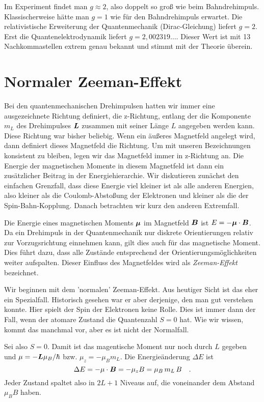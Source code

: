 Im Experiment findet man $g \approx 2$, also doppelt so groß wie beim Bahndrehimpuls. Klassischerweise hätte man $g=1$ wie für den Bahndrehimpuls erwartet. Die relativistische Erweiterung der Quantenmechanik (Dirac-Gleichung) liefert $g=2$. Erst die Quantenelektrodynamik liefert $g=2,002319\dots$. Dieser Wert ist mit 13 Nachkommastellen extrem genau bekannt und stimmt mit der Theorie überein.


\section{Normaler Zeeman-Effekt}

Bei den quantenmechanischen Drehimpulsen hatten wir immer eine ausgezeichnete Richtung definiert, die z-Richtung, entlang der die Komponente $m_L$ des Drehimpulses $\boldsymbol{L}$ zusammen mit seiner Länge $L$ angegeben werden kann. Diese Richtung war bisher beliebig. Wenn ein äußeres Magnetfeld angelegt wird, dann definiert dieses Magnetfeld die Richtung. Um mit unseren Bezeichnungen konsistent zu bleiben, legen wir das Magnetfeld immer in z-Richtung an. Die Energie der magnetischen Momente in diesem Magnetfeld ist dann ein zusätzlicher Beitrag in der Energiehierarchie. Wir diskutieren zunächst den einfachen Grenzfall, dass diese Energie viel kleiner ist als alle anderen Energien, also kleiner als die Coulomb-Abstoßung  der Elektronen und kleiner als die der Spin-Bahn-Kopplung. Danach betrachten wir kurz den anderen Extremfall.

Die Energie eines magnetischen Moments $\boldsymbol{\mu}$ im Magnetfeld $\boldsymbol{B}$ ist $E = - \boldsymbol{\mu} \cdot \boldsymbol{B}$. Da ein Drehimpuls in der Quantenmechanik nur diskrete Orientierungen relativ zur Vorzugsrichtung einnehmen kann, gilt dies auch für das magnetische Moment. Dies führt dazu, dass alle Zustände entsprechend der Orientierungsmöglichkeiten weiter aufspalten. Dieser Einfluss des Magnetfeldes wird als \emph{Zeeman-Effekt} bezeichnet. 

Wir beginnen mit dem 'normalen' Zeeman-Effekt. Aus heutiger Sicht ist das eher ein Spezialfall. Historisch gesehen war er aber derjenige, den man gut verstehen konnte. Hier spielt der Spin der Elektronen keine Rolle. Dies ist immer dann der Fall, wenn der atomare Zustand die Quantenzahl $S=0$ hat. Wie wir wissen, kommt das manchmal vor, aber es ist nicht der Normalfall.

Sei also $S=0$. Damit ist das magentische Moment nur noch durch $L$ gegeben und $\mu = - \boldsymbol{L} \mu_B / \hbar$ bzw. $\mu_z = - \mu_B  m_L$. Die Energieänderung $\Delta E$ ist
\begin{equation}
    \Delta E = - \mu \cdot \boldsymbol{B} =- \mu_z B =  \mu_B \, m_L \, B  \quad .
\end{equation}
Jeder Zustand spaltet also in $2L + 1$ Niveaus auf, die voneinander dem Abstand $\mu_B B$ haben.

